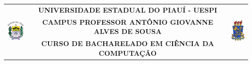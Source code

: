 \begin{table}[ht]
\centering
\fontsize{10}{16}\selectfont
\begin{tabular}{lcr}
\multirow{3}{*}{\hspace{0cm}\includegraphics[width=1.25cm]{images/piaui.jpg}} & \textbf{UNIVERSIDADE ESTADUAL DO PIAUÍ - UESPI} & \multirow{3}{*}{\includegraphics[width=1cm]{images/uespi.jpg}} \\
& \textbf{CAMPUS PROFESSOR ANTÔNIO GIOVANNE ALVES DE SOUSA} & \\
& \textbf{CURSO DE BACHARELADO EM CIÊNCIA DA COMPUTAÇÃO} &
\end{tabular}
\end{table}
\imprimircapa